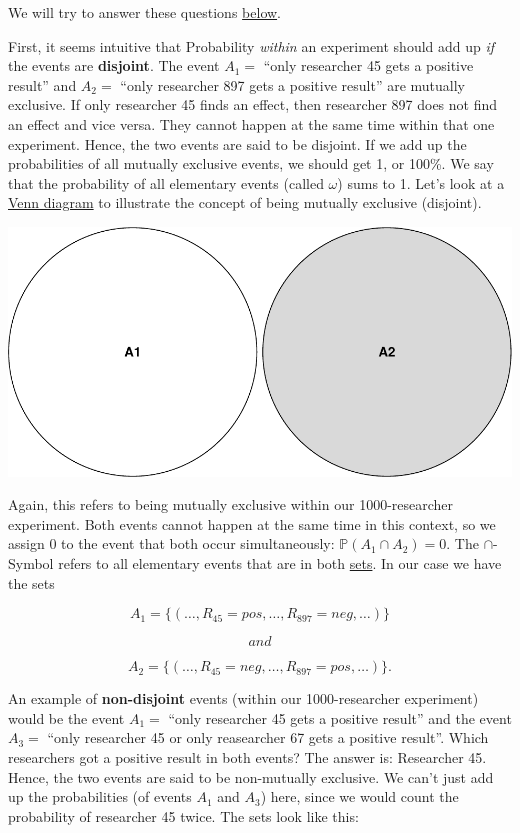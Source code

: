 \documentclass[
]{book}
\newcommand{\pandocbounded}[1]{#1}
\begin{document}
We will try to answer these questions \hyperref[Answers_Questions_about_the_1000-researcher_experiment]{below}.

First, it seems intuitive that Probability \emph{within} an experiment should add up \emph{if} the events are \textbf{disjoint}.
The event \(A_1=\) ``only researcher 45 gets a positive result'' and \(A_2=\) ``only researcher 897 gets a positive result'' are mutually exclusive.
If only researcher 45 finds an effect, then researcher 897 does not find an effect and vice versa. They cannot happen at the same time within that one
experiment. Hence, the two events are said to be disjoint.
If we add up the probabilities of all mutually exclusive events, we should get 1, or 100\%.
We say that the probability of all elementary events (called \(\omega\)) sums to 1. Let's look at a \href{https://en.wikipedia.org/wiki/Venn_diagram}{Venn diagram} to illustrate the concept of being mutually exclusive (disjoint).

\pandocbounded{\includegraphics[keepaspectratio]{_main_files/figure-latex/unnamed-chunk-2-1.pdf}}

Again, this refers to being mutually exclusive within our 1000-researcher experiment.
Both events cannot happen at the same time in this context, so we assign \(0\) to the event that both occur simultaneously: \(\mathbb{P}(A_1 \cap A_2)=0\). The \(\cap\)-Symbol refers to all elementary events
that are in both \href{https://en.wikipedia.org/wiki/Set_(mathematics)}{sets}. In our case we have the sets

\[A_1 = \{ (\dots ,R_{45} = pos, \dots ,R_{897} = neg, \dots) \}\]

\[and\]

\[A_2 = \{ (\dots ,R_{45} = neg, \dots , R_{897} = pos, \dots) \}.\]

An example of \textbf{non-disjoint} events (within our 1000-researcher experiment) would be the event \(A_1=\) ``only researcher 45 gets a positive result'' and
the event \(A_3=\) ``only researcher 45 or only reasearcher 67 gets a positive result''.
Which researchers got a positive result in both events? The answer is: Researcher 45. Hence, the two events are said to be non-mutually exclusive. We can't just
add up the probabilities (of events \(A_1\) and \(A_3\)) here, since we would count the probability of researcher 45 twice.
The sets look like this:
\end{document}
